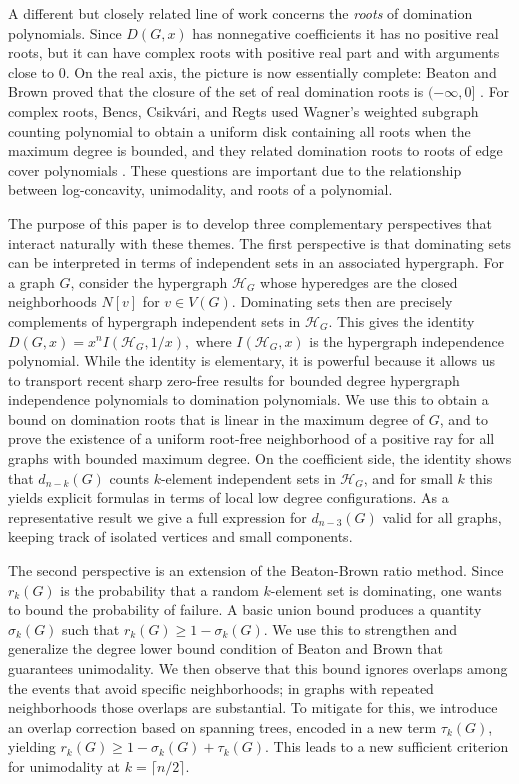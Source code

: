 \documentclass[11pt]{amsart}
\numberwithin{equation}{section}
\newcommand{\VV}{V(G)}
\newcommand{\HH}{\mathcal{H}}
\begin{document}
A different but closely related line of work concerns the \emph{roots} of domination polynomials. Since $D(G,x)$ has nonnegative coefficients it has no positive real roots, but it can have complex roots with positive real part and with arguments close to $0$. On the real axis, the picture is now essentially complete: Beaton and Brown proved that the closure of the set of real domination roots is $(-\infty,0]$ \cite{BeatonBrownRealRoots2021}. For complex roots, Bencs, Csikv\'ari, and Regts used Wagner's weighted subgraph counting polynomial to obtain a uniform disk containing all roots when the maximum degree is bounded, and they related domination roots to roots of edge cover polynomials \cite{BencsCsikvariRegts2021}. These questions are important due to the relationship between log-concavity, unimodality, and roots of a polynomial.

The purpose of this paper is to develop three complementary perspectives that interact naturally with these themes. The first perspective is that dominating sets can be interpreted in terms of independent sets in an associated hypergraph. For a graph $G$, consider the hypergraph $\HH_G$ whose hyperedges are the closed neighborhoods $N[v]$ for $v \in \VV$. Dominating sets then are precisely complements of hypergraph independent sets in $\HH_G$. This gives the identity $D(G,x)=x^n I(\HH_G,1/x),$ where $I(\HH_G,x)$ is the hypergraph independence polynomial. While the identity is elementary, it is powerful because it allows us to transport recent sharp zero-free results for bounded degree hypergraph independence polynomials to domination polynomials. We use this to obtain a bound on domination roots that is linear in the maximum degree of $G$, and to prove the existence of a uniform root-free neighborhood of a positive ray for all graphs with bounded maximum degree. On the coefficient side, the identity shows that $d_{n-k}(G)$ counts $k$-element independent sets in $\HH_G$, and for small $k$ this yields explicit formulas in terms of local low degree configurations. As a representative result we give a full expression for $d_{n-3}(G)$ valid for all graphs, keeping track of isolated vertices and small components.

The second perspective is an extension of the Beaton-Brown ratio method. Since $r_k(G)$ is the probability that a random $k$-element set is dominating, one wants to bound the probability of failure. A basic union bound produces a quantity $\sigma_k(G)$ such that $r_k(G)\ge 1-\sigma_k(G)$. We use this to strengthen and generalize the degree lower bound condition of Beaton and Brown that guarantees unimodality. We then observe that this bound ignores overlaps among the events that avoid specific neighborhoods; in graphs with repeated neighborhoods those overlaps are substantial. To mitigate for this, we introduce an overlap correction based on spanning trees, encoded in a new term $\tau_k(G)$, yielding $r_k(G)\ge 1-\sigma_k(G)+\tau_k(G)$. This leads to a new sufficient criterion for unimodality at $k=\lceil n/2\rceil$. 
\end{document}
